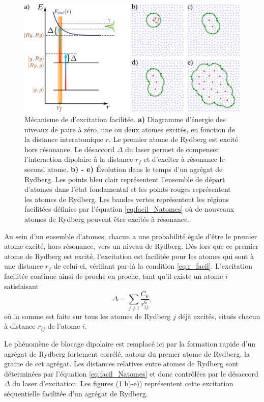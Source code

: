 \begin{figure}[!h]
\centering
\includegraphics[height=.3\textheight]{figures/low_l/dip_facil}
\caption[Mécanisme de d'excitation facilitée]{
Mécanisme de d'excitation facilitée.
\textbf{a)} Diagramme d'énergie des niveaux de paire à zéro, une ou deux atomes excités, en fonction de la distance interatomique $r$.
Le premier atome de Rydberg est excité hors résonance.
Le désaccord $\Delta$ du laser permet de compenser l'interaction dipolaire à la distance $r_f$ et d'exciter à résonance le second atome.
\textbf{b) - e)} Évolution dans le temps d'un agrégat de Rydberg.
Les points bleu clair représentent l'ensemble de départ d'atomes dans l'état fondamental et les points rouges représentent les atomes de Rydberg.
Les bandes vertes représentent les régions \og facilitées \fg{} définies par l'équation \eqref{eq:facil_Natomes} où de nouveaux atomes de Rydberg peuvent être excités à résonance.
}
\label{fig:dip_facil}
\end{figure}

Au sein d'un ensemble d'atomes, chacun a une probabilité égale d'être le premier atome excité, hors résonance, vers un niveau de Rydberg.
Dès lors que ce premier atome de Rydberg est excité, l'excitation est facilitée pour les atomes qui sont à une distance $r_f$ de celui-ci, vérifiant par-là la condition \eqref{eq:r_facil}.
L'excitation facilitée continue ainsi de proche en proche, tant qu'il existe un atome $i$ satisfaisant
\begin{equation}
\label{eq:facil_Natomes}
\Delta = \sum_{j\neq i} {\frac{C_6}{r_{ij}^6}},
\end{equation}
où la somme est faite sur tous les atomes de Rydberg $j$ déjà excités, situés chacun à distance $r_{ij}$ de l'atome $i$.

Le phénomène de blocage dipolaire est remplacé ici par la formation rapide d'un \og agrégat de Rydberg \fg{} fortement corrélé, autour du premer atome de Rydberg, la \og graine \fg{} de cet agrégat.
Les distances relatives entre atomes de Rydberg sont déterminées par l'équation \eqref{eq:facil_Natomes} et donc contrôlées par le désaccord $\Delta$ du laser d'excitation.
Les figures (\ref{fig:dip_facil} b)-e)) représentent cette excitation séquentielle facilitée d'un agrégat de Rydberg.

